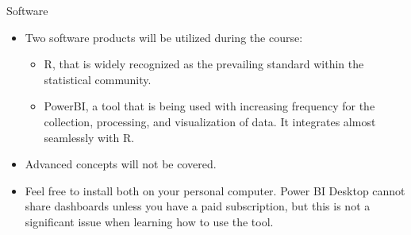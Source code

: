 \begin{frame}[fragile]{Software}
\begin{itemize}
    \item<+-> Two software products will be utilized during the course:
    \begin{itemize}
        \item<+-> R, that is widely recognized as the prevailing standard within the statistical community.
        \item<+-> PowerBI, a tool that is being used with increasing frequency for the collection, processing, and visualization of data. It integrates almost seamlessly with R. 
    \end{itemize}
    \item<+-> Advanced concepts will not be covered. 
    \item<+-> Feel free to install both on your personal computer. Power BI Desktop cannot share dashboards
     unless you have a paid subscription, but this is not a significant issue when learning how to use the tool. 
    \end{itemize}
\end{frame}